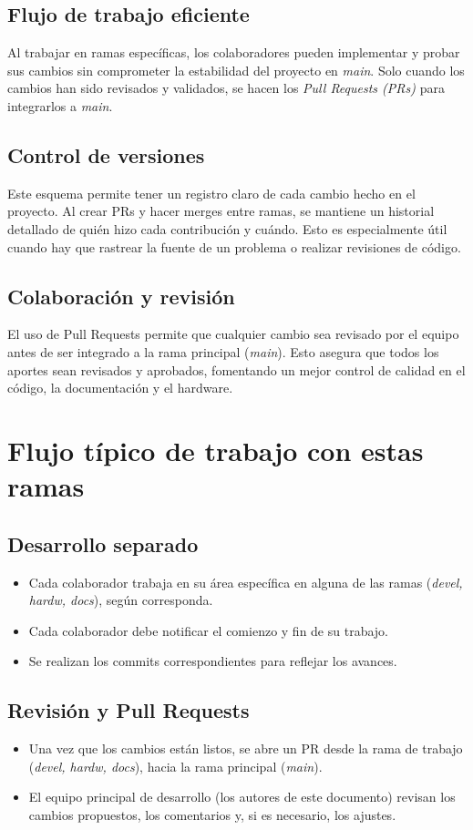 \documentclass[a4paper]{article}
\begin{document}
    \subsection{Flujo de trabajo eficiente}
    \indent Al trabajar en ramas específicas, los colaboradores pueden implementar y probar sus cambios sin comprometer la estabilidad del proyecto en \textit{main}. Solo cuando los cambios han sido revisados y validados, se hacen los \textit{Pull Requests (PRs)} para integrarlos a \textit{main}.
    \subsection{Control de versiones}
    \indent Este esquema permite tener un registro claro de cada cambio hecho en el proyecto. Al crear PRs y hacer merges entre ramas, se mantiene un historial detallado de quién hizo cada contribución y cuándo. Esto es especialmente útil cuando hay que rastrear la fuente de un problema o realizar revisiones de código.
    \subsection{Colaboración y revisión}
    El uso de Pull Requests permite que cualquier cambio sea revisado por el equipo antes de ser integrado a la rama principal (\textit{main}). Esto asegura que todos los aportes sean revisados y aprobados, fomentando un mejor control de calidad en el código, la documentación y el hardware.

\section{Flujo típico de trabajo con estas ramas}
    \subsection{Desarrollo separado}
        \begin{itemize}
            \item Cada colaborador trabaja en su área específica en alguna de las ramas (\textit{devel, hardw, docs}), según corresponda.
            \item Cada colaborador debe notificar el comienzo y fin de su trabajo.
            \item Se realizan los commits correspondientes para reflejar los avances.
        \end{itemize}

    \subsection{Revisión y Pull Requests}
        \begin{itemize}
            \item Una vez que los cambios están listos, se abre un PR desde la rama de trabajo (\textit{devel, hardw, docs}), hacia la rama principal (\textit{main}).
            \item El equipo principal de desarrollo (los autores de este documento) revisan los cambios propuestos, los comentarios y, si es necesario, los ajustes.
        \end{itemize}
\end{document}

